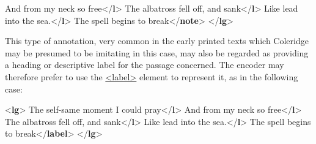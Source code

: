\begin{shaded}
And from my neck so free{</\textbf{l}>}\mbox{}\newline 
{}The albatross fell off, and sank{</\textbf{l}>}\mbox{}\newline 
{}Like lead into the sea.{</\textbf{l}>}\mbox{}\newline 
{}The spell begins to break{</\textbf{note}>}\mbox{}\newline 
{</\textbf{lg}>}\end{shaded}\egroup\par \par
This type of annotation, very common in the early printed texts which Coleridge may be presumed to be imitating in this case, may also be regarded as providing a heading or descriptive label for the passage concerned. The encoder may therefore prefer to use the \hyperref[TEI.label]{<label>} element to represent it, as in the following case: \par\bgroup{}\exampleFont \begin{shaded}\noindent\mbox{}{<\textbf{lg}>}\mbox{}\newline 
{}The self-same moment I could pray{</\textbf{l}>}\mbox{}\newline 
{}And from my neck so free{</\textbf{l}>}\mbox{}\newline 
{}The albatross fell off, and sank{</\textbf{l}>}\mbox{}\newline 
{}Like lead into the sea.{</\textbf{l}>}\mbox{}\newline 
{}The spell begins to break{</\textbf{label}>}\mbox{}\newline 
{</\textbf{lg}>}\end{shaded}\egroup\par \par
